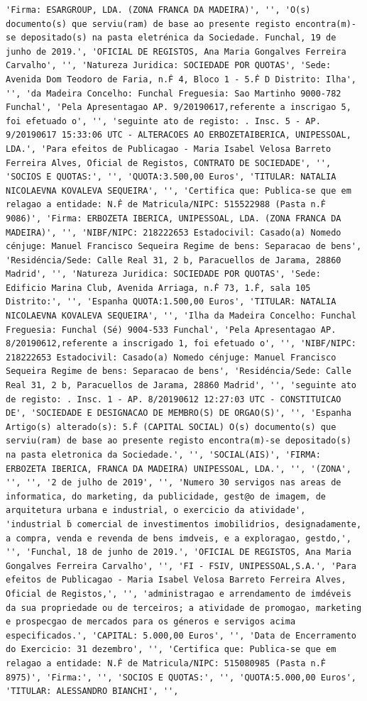 \documentclass[
  12pt,
]{article}
\begin{document}
\begin{verbatim}
'Firma: ESARGROUP, LDA. (ZONA FRANCA DA MADEIRA)', '', 'O(s) documento(s) que serviu(ram) de base ao presente registo encontra(m)-se depositado(s) na pasta eletrénica da Sociedade. Funchal, 19 de junho de 2019.', 'OFICIAL DE REGISTOS, Ana Maria Gongalves Ferreira Carvalho', '', 'Natureza Juridica: SOCIEDADE POR QUOTAS', 'Sede: Avenida Dom Teodoro de Faria, n.Ḟ 4, Bloco 1 - 5.Ḟ D Distrito: Ilha', '', 'da Madeira Concelho: Funchal Freguesia: Sao Martinho 9000-782 Funchal', 'Pela Apresentagao AP. 9/20190617,referente a inscrigao 5, foi efetuado o', '', 'seguinte ato de registo: . Insc. 5 - AP. 9/20190617 15:33:06 UTC - ALTERACOES AO ERBOZETAIBERICA, UNIPESSOAL, LDA.', 'Para efeitos de Publicagao - Maria Isabel Velosa Barreto Ferreira Alves, Oficial de Registos, CONTRATO DE SOCIEDADE', '', 'SOCIOS E QUOTAS:', '', 'QUOTA:3.500,00 Euros', 'TITULAR: NATALIA NICOLAEVNA KOVALEVA SEQUEIRA', '', 'Certifica que: Publica-se que em relagao a entidade: N.Ḟ de Matricula/NIPC: 515522988 (Pasta n.Ḟ 9086)', 'Firma: ERBOZETA IBERICA, UNIPESSOAL, LDA. (ZONA FRANCA DA MADEIRA)', '', 'NIBF/NIPC: 218222653 Estadocivil: Casado(a) Nomedo cénjuge: Manuel Francisco Sequeira Regime de bens: Separacao de bens', 'Residéncia/Sede: Calle Real 31, 2 b, Paracuellos de Jarama, 28860 Madrid', '', 'Natureza Juridica: SOCIEDADE POR QUOTAS', 'Sede: Edificio Marina Club, Avenida Arriaga, n.Ḟ 73, 1.Ḟ, sala 105 Distrito:', '', 'Espanha QUOTA:1.500,00 Euros', 'TITULAR: NATALIA NICOLAEVNA KOVALEVA SEQUEIRA', '', 'Ilha da Madeira Concelho: Funchal Freguesia: Funchal (Sé) 9004-533 Funchal', 'Pela Apresentagao AP. 8/20190612,referente a inscrigado 1, foi efetuado o', '', 'NIBF/NIPC: 218222653 Estadocivil: Casado(a) Nomedo cénjuge: Manuel Francisco Sequeira Regime de bens: Separacao de bens', 'Residéncia/Sede: Calle Real 31, 2 b, Paracuellos de Jarama, 28860 Madrid', '', 'seguinte ato de registo: . Insc. 1 - AP. 8/20190612 12:27:03 UTC - CONSTITUICAO DE', 'SOCIEDADE E DESIGNACAO DE MEMBRO(S) DE ORGAO(S)', '', 'Espanha Artigo(s) alterado(s): 5.Ḟ (CAPITAL SOCIAL) O(s) documento(s) que serviu(ram) de base ao presente registo encontra(m)-se depositado(s) na pasta eletronica da Sociedade.', '', 'SOCIAL(AIS)', 'FIRMA: ERBOZETA IBERICA, FRANCA DA MADEIRA) UNIPESSOAL, LDA.', '', '(ZONA', '', '', '2 de julho de 2019', '', 'Numero 30 servigos nas areas de informatica, do marketing, da publicidade, gest@o de imagem, de arquitetura urbana e industrial, o exercicio da atividade', 'industrial ḃ comercial de investimentos imobilidrios, designadamente, a compra, venda e revenda de bens imdveis, e a exploragao, gestdo,', '', 'Funchal, 18 de junho de 2019.', 'OFICIAL DE REGISTOS, Ana Maria Gongalves Ferreira Carvalho', '', 'FI - FSIV, UNIPESSOAL,S.A.', 'Para efeitos de Publicagao - Maria Isabel Velosa Barreto Ferreira Alves, Oficial de Registos,', '', 'administragao e arrendamento de imdéveis da sua propriedade ou de terceiros; a atividade de promogao, marketing e prospecgao de mercados para os géneros e servigos acima especificados.', 'CAPITAL: 5.000,00 Euros', '', 'Data de Encerramento do Exercicio: 31 dezembro', '', 'Certifica que: Publica-se que em relagao a entidade: N.Ḟ de Matricula/NIPC: 515080985 (Pasta n.Ḟ 8975)', 'Firma:', '', 'SOCIOS E QUOTAS:', '', 'QUOTA:5.000,00 Euros', 'TITULAR: ALESSANDRO BIANCHI', '', 
\end{verbatim}
\end{document}
